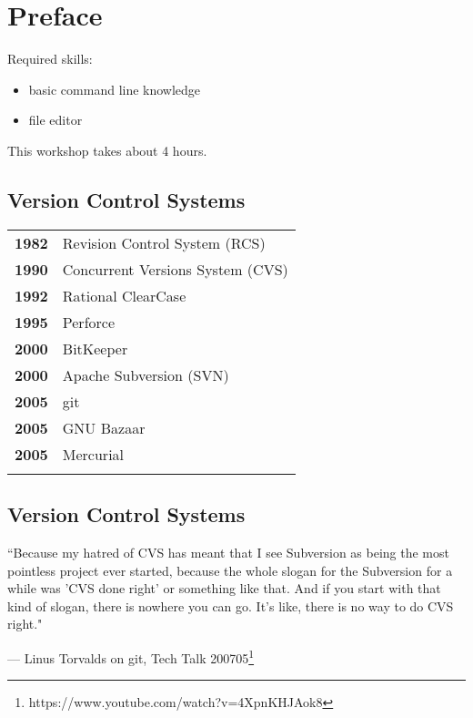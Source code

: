 \section{Preface}
\begin{frame}
  \slidetitle

  Required skills:
  \begin{itemize}
    \item basic command line knowledge
    \item file editor
  \end{itemize}
  \vspace{1em}
  This workshop takes about 4 hours.
\end{frame}

\subsection{Version Control Systems}
\begin{frame}
  \subslidetitle


  \begin{tabular}{lp{5cm}}
    \textbf{1982} & Revision Control System (RCS) \\
    \pause
    \textbf{1990} & Concurrent Versions System (CVS)\\
    \pause
    \textbf{1992} & Rational ClearCase\\
    \pause
    \textbf{1995} & Perforce \\
    \pause
    \textbf{2000} & BitKeeper\\
    \pause
    \textbf{2000} & Apache Subversion (SVN) \\
    \pause
    \textbf{2005} & git \\
    \pause
    \textbf{2005} & GNU Bazaar\\
    \pause
    \textbf{2005} & Mercurial \\
    \pause
  \end{tabular}
\end{frame}

\subsection{Version Control Systems}
\begin{frame}
  \subslidetitle
  \epigraph{``Because my hatred of CVS has meant that I see Subversion as being the most pointless project ever started, because the whole slogan for the Subversion for a while was 'CVS done right' or something like that. And if you start with that kind of slogan, there is nowhere you can go. It's like, there is no way to do CVS right."}
  {--- Linus Torvalds on git, Tech Talk 200705\footnote{https://www.youtube.com/watch?v=4XpnKHJAok8}}
\end{frame}

